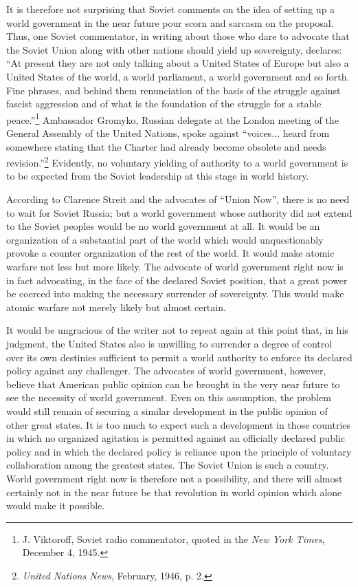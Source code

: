It is therefore not surprising that Soviet comments on the idea of setting up a world government in the near future pour scorn and sarcasm on the proposal. Thus, one Soviet commentator, in writing about those who dare to advocate that the Soviet Union along with other nations should yield up sovereignty, declares: ``At present they are not only talking about a United States of Europe but also a United States of the world, a world parliament, a world government and so forth. Fine phrases, and behind them renunciation of the basis of the struggle against fascist aggression and of what is the foundation of the struggle for a stable peace.''\footnote{J. Viktoroff, Soviet radio commentator, quoted in the \textit{New York Times}, December 4, 1945.} Ambassador Gromyko, Russian delegate at the London meeting of the General Assembly of the United Nations, spoke against ``voices... heard from somewhere stating that the Charter had already become obsolete and needs revision.''\footnote{\textit{United Nations News}, February, 1946, p. 2.} Evidently, no voluntary yielding of authority to a world government is to be expected from the Soviet leadership at this stage in world history.

According to Clarence Streit and the advocates of ``Union Now'', there is no need to wait for Soviet Russia; but a world government whose authority did not extend to the Soviet peoples would be no world government at all. It would be an organization of a substantial part of the world which would unquestionably provoke a counter organization of the rest of the world. It would make atomic warfare not less but more likely. The advocate of world government right now is in fact advocating, in the face of the declared Soviet position, that a great power be coerced into making the necessary surrender of sovereignty. This would make atomic warfare not merely likely but almost certain.

It would be ungracious of the writer not to repeat again at this point that, in his judgment, the United States also is unwilling to surrender a degree of control over its own destinies sufficient to permit a world authority to enforce its declared policy against any challenger. The advocates of world government, however, believe that American public opinion can be brought in the very near future to see the necessity of world government. Even on this assumption, the problem would still remain of securing a similar development in the public opinion of other great states. It is too much to expect such a development in those countries in which no organized agitation is permitted against an officially declared public policy and in which the declared policy is reliance upon the principle of voluntary collaboration among the greatest states. The Soviet Union is such a country. World government right now is therefore not a possibility, and there will almost certainly not in the near future be that revolution in world opinion which alone would make it possible.

